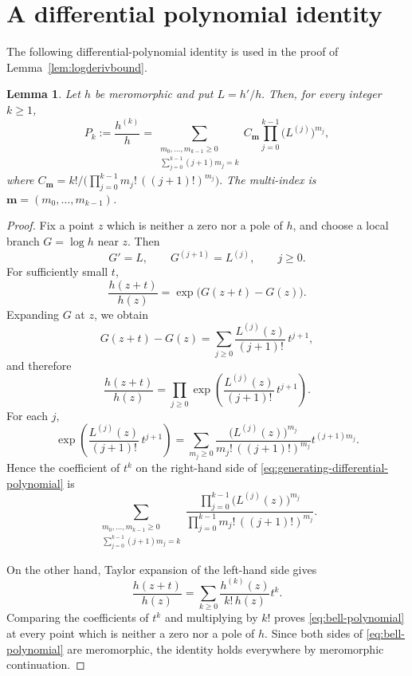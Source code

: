 \documentclass[12pt,letterpaper,reqno]{amsart}
\newtheorem{lem}[thm]{Lemma}
\theoremstyle{definition}
\numberwithin{equation}{section}
\begin{document}
\section{A differential polynomial identity}\label{app:differential-polynomial}
The following differential-polynomial identity is used in the proof of Lemma~\ref{lem:logderivbound}.

\begin{lem}\label{lem:differential-polynomial}
Let \(h\) be meromorphic and put
$
L={h'}/{h}.
$
Then, for every integer \(k\ge1\),
\begin{equation}\label{eq:bell-polynomial}
P_k:=\frac{h^{(k)}}{h}=
\sum_{\substack{m_0,\ldots,m_{k-1}\ge0\\
\sum_{j=0}^{k-1}(j+1)m_j=k}}
C_{\mathbf m}
\prod_{j=0}^{k-1}
\bigl(L^{(j)}\bigr)^{m_j},
\end{equation}
where
$
C_{\mathbf m}
=
{k!}/
{\Big(\displaystyle\prod_{j=0}^{k-1}
m_j!\,((j+1)!)^{m_j}\Big)}.
$
The multi-index is \(\mathbf m=(m_0,\ldots,m_{k-1})\).
\end{lem}

\begin{proof}
Fix a point \(z\) which is neither a zero nor a pole of \(h\), and choose
a local branch \(G=\log h\) near \(z\). Then
$$
G'=L,\qquad
G^{(j+1)}=L^{(j)},\qquad j\ge0.
$$
For sufficiently small \(t\),
$$
\frac{h(z+t)}{h(z)}
=
\exp\bigl(G(z+t)-G(z)\bigr).
$$
Expanding \(G\) at \(z\), we obtain
$$
G(z+t)-G(z)
=
\sum_{j\ge0}
\frac{L^{(j)}(z)}{(j+1)!}\,t^{j+1},
$$
and therefore
\begin{equation}\label{eq:generating-differential-polynomial}
\frac{h(z+t)}{h(z)}
=
\prod_{j\ge0}
\exp\left(
 \frac{L^{(j)}(z)}{(j+1)!}\,t^{j+1}
\right).
\end{equation}
For each \(j\),
$$
\exp\left(
\frac{L^{(j)}(z)}{(j+1)!}\,t^{j+1}
\right)
=
\sum_{m_j\ge0}
\frac{\bigl(L^{(j)}(z)\bigr)^{m_j}}
{m_j!\,((j+1)!)^{m_j}}
t^{(j+1)m_j}.
$$
Hence the coefficient of \(t^k\) on the right-hand side of
\eqref{eq:generating-differential-polynomial} is
$$
\sum_{\substack{m_0,\ldots,m_{k-1}\ge0\\
\sum_{j=0}^{k-1}(j+1)m_j=k}}
\frac{\displaystyle
\prod_{j=0}^{k-1}
\bigl(L^{(j)}(z)\bigr)^{m_j}}
{\displaystyle
\prod_{j=0}^{k-1}
m_j!\,((j+1)!)^{m_j}}.
$$

On the other hand, Taylor expansion of the left-hand side gives
$$
\frac{h(z+t)}{h(z)}
=
\sum_{k\ge0}
\frac{h^{(k)}(z)}{k!\,h(z)}t^k.
$$
Comparing the coefficients of \(t^k\) and multiplying by \(k!\) proves
\eqref{eq:bell-polynomial} at every point which is neither a zero nor a
pole of \(h\). Since both sides of \eqref{eq:bell-polynomial} are
meromorphic, the identity holds everywhere by meromorphic continuation.
\end{proof}
\end{document}
